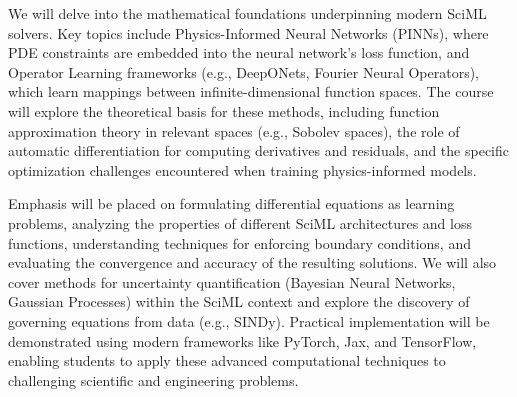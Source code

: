 \documentclass[11pt,fourier]{article}
\begin{document}
We will delve into the mathematical foundations underpinning modern SciML solvers. Key topics include Physics-Informed Neural Networks (PINNs), where PDE constraints are embedded into the neural network's loss function, and Operator Learning frameworks (e.g., DeepONets, Fourier Neural Operators), which learn mappings between infinite-dimensional function spaces. The course will explore the theoretical basis for these methods, including function approximation theory in relevant spaces (e.g., Sobolev spaces), the role of automatic differentiation for computing derivatives and residuals, and the specific optimization challenges encountered when training physics-informed models.

Emphasis will be placed on formulating differential equations as learning problems, analyzing the properties of different SciML architectures and loss functions, understanding techniques for enforcing boundary conditions, and evaluating the convergence and accuracy of the resulting solutions. We will also cover methods for uncertainty quantification (Bayesian Neural Networks, Gaussian Processes) within the SciML context and explore the discovery of governing equations from data (e.g., SINDy). Practical implementation will be demonstrated using modern frameworks like PyTorch, Jax, and TensorFlow, enabling students to apply these advanced computational techniques to challenging scientific and engineering problems.
\end{document}
